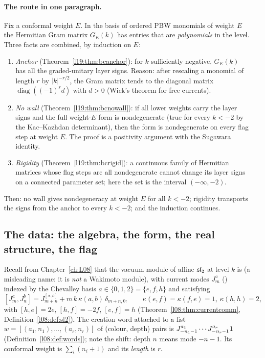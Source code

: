 \paragraph{The route in one paragraph.} Fix a conformal weight $E$. In the basis of ordered PBW monomials of
weight $E$ the Hermitian Gram matrix $G_E(k)$ has entries that are \emph{polynomials} in the level. Three facts
are combined, by induction on $E$:
\begin{enumerate}
\item \emph{Anchor} (Theorem~\ref{l19:thm:bcanchor}): for $k$ sufficiently negative, $G_E(k)$ has all the
  graded-unitary layer signs. Reason: after rescaling a monomial of length $r$ by $|k|^{-r/2}$, the Gram matrix
  tends to the diagonal matrix $\operatorname{diag}((-1)^r d)$ with $d>0$ (Wick's theorem for free currents).
\item \emph{No wall} (Theorem~\ref{l19:thm:bcnowall}): if all lower weights carry the layer signs and the full
  weight-$E$ form is nondegenerate (true for every $k<-2$ by the Kac--Kazhdan determinant), then the form is
  nondegenerate on every flag step at weight $E$. The proof is a positivity argument with the Sugawara
  identity.
\item \emph{Rigidity} (Theorem~\ref{l19:thm:bcrigid}): a continuous family of Hermitian matrices whose flag steps
  are all nondegenerate cannot change its layer signs on a connected parameter set; here the set is the
  interval $(-\infty,-2)$.
\end{enumerate}
Then: no wall gives nondegeneracy at weight $E$ for all $k<-2$; rigidity transports the signs from the anchor
to every $k<-2$; and the induction continues.

\subsection{The data: the algebra, the form, the real structure, the flag}

Recall from Chapter~\ref{ch:L08} that the vacuum module of affine $\mathfrak{sl}_2$ at level $k$ is 
(a misleading name: it is \emph{not} a Wakimoto module), with current modes $J^a_m$ () indexed by
the Chevalley basis $a\in\{0,1,2\} = \{e,f,h\}$ and satisfying
\begin{equation}\label{l19:eq:bccomm}
  [J^a_m,J^b_n] = J^{[a,b]}_{m+n} + m\,k\,\kappa(a,b)\,\delta_{m+n,0},\qquad
  \kappa(e,f) = \kappa(f,e) = 1,\ \kappa(h,h) = 2,
\end{equation}
with $[h,e] = 2e$, $[h,f] = -2f$, $[e,f] = h$ (Theorem~\ref{l08:thm:currentcomm}, Definition~\ref{l08:def:sl2}).
The creation word  attached to a list $w = [(a_1,n_1),\dots,(a_r,n_r)]$ of (colour, depth)
pairs is $J^{a_1}_{-n_1-1}\cdots J^{a_r}_{-n_r-1}\mathbf{1}$ (Definition~\ref{l08:def:words}); note the
shift: depth $n$ means mode $-n-1$. Its conformal weight is $\sum_i(n_i+1)$ and its \emph{length} is $r$.

